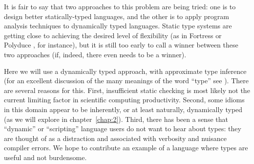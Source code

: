 It is fair to say that two approaches to this problem are being tried: one is
to design better statically-typed languages, and the other is to apply
program analysis techniques to dynamically typed languages.
Static type systems are getting close to achieving the desired level
of flexibility (as in Fortress \cite{fortresspec} or Polyduce \cite{polyduce1},
for instance), but it is still too early to call a winner between these two
approaches (if, indeed, there even needs to be a winner).

Here we will use a dynamically typed approach, with approximate type inference
(for an excellent discussion of the many meanings of the word ``type''
see \cite{Kell2014}).
There are several reasons for this.
First, insufficient static checking is most likely not the current limiting
factor in scientific computing productivity.
Second, some idioms in this domain appear to be inherently, or at least naturally,
dynamically typed (as we will explore in chapter~\ref{chap:2}).
Third, there has been a sense that ``dynamic'' or ``scripting'' language users do
not want to hear about types: they are thought of as a distraction and
associated with verbosity and nuisance compiler errors.
We hope to contribute an example of a language where types are useful and not
burdensome.




